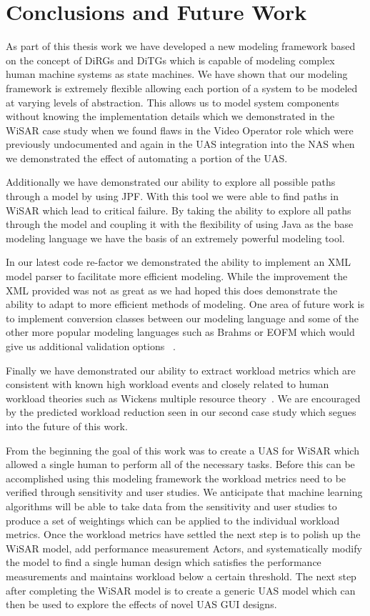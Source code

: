 \chapter{Conclusions and Future Work}

As part of this thesis work we have developed a new modeling framework based on the concept of DiRGs and DiTGs which is capable of modeling complex human machine systems as state machines.  We have shown that our modeling framework is extremely flexible allowing each portion of a system to be modeled at varying levels of abstraction.  This allows us to model system components without knowing the implementation details which we demonstrated in the WiSAR case study when we found flaws in the Video Operator role which were previously undocumented and again in the UAS integration into the NAS when we demonstrated the effect of automating a portion of the UAS.  

Additionally we have demonstrated our ability to explore all possible paths through a model by using JPF.  With this tool we were able to find paths in WiSAR which lead to critical failure.  By taking the ability to explore all paths through the model and coupling it with the flexibility of using Java as the base modeling language we have the basis of an extremely powerful modeling tool.

In our latest code re-factor we demonstrated the ability to implement an XML model parser to facilitate more efficient modeling.  While the improvement the XML provided was not as great as we had hoped this does demonstrate the ability to adapt to more efficient methods of modeling.  One area of future work is to implement conversion classes between our modeling language and some of the other more popular modeling languages such as Brahms or EOFM which would give us additional validation options ~\cite{bolton2013litreview}.

Finally we have demonstrated our ability to extract workload metrics which are consistent with known high workload events and closely related to human workload theories such as Wickens multiple resource theory~\cite{wickens2002multiple}.  We are encouraged by the predicted workload reduction seen in our second case study which segues into the future of this work.

From the beginning the goal of this work was to create a UAS for WiSAR which allowed a single human to perform all of the necessary tasks.  Before this can be accomplished using this modeling framework the workload metrics need to be verified through sensitivity and user studies.  We anticipate that machine learning algorithms will be able to take data from the sensitivity and user studies to produce a set of weightings which can be applied to the individual workload metrics.  Once the workload metrics have settled the next step is to polish up the WiSAR model, add performance measurement Actors, and systematically modify the model to find a single human design which satisfies the performance measurements and maintains workload below a certain threshold.  The next step after completing the WiSAR model is to create a generic UAS model which can then be used to explore the effects of novel UAS GUI designs.

